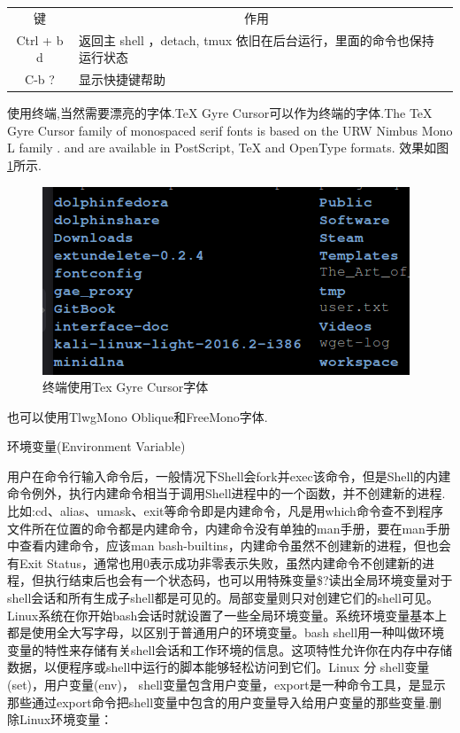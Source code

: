 \documentclass[12pt]{book}
\makeatletter
\numberwithin{dummy}{section}
\theoremstyle{ocrenumbox}
\theoremstyle{blacknumex}
\theoremstyle{blacknumbox}
\theoremstyle{ocrenum}
\renewcommand{\subsection}{\@startsection {subsection}{2}{\z@}
	{-3ex \@plus -0.1ex \@minus -.4ex}
	{0.5ex \@plus.2ex }
	{\normalfont\sffamily\bfseries}}
\makeatother
\begin{document}
\begin{tabular}{|c|p{8cm}|c|}
	\hline
	\multirow{1}{*}{键}
	& \multicolumn{1}{c|}{作用}  \\			
	\cline{1-2}
	Ctrl + b d  & 返回主 shell ，detach, tmux 依旧在后台运行，里面的命令也保持运行状态\\
	\hline
	C-b ? & 显示快捷键帮助\\
	\hline
\end{tabular}

使用终端,当然需要漂亮的字体.TeX Gyre Cursor可以作为终端的字体.The TeX Gyre Cursor family of monospaced serif fonts is based on the URW Nimbus Mono L family . and are available in PostScript, TeX and OpenType formats. 效果如图\ref{fig:fonttexgyrecursor}所示.

\begin{figure}[htbp]
	\centering
	\includegraphics[scale=0.5]{fonttexgyrecursor.png}
	\caption{终端使用Tex Gyre Cursor字体}
	\label{fig:fonttexgyrecursor}
\end{figure}

也可以使用TlwgMono Oblique和FreeMono字体.

\subsection{环境变量(Environment Variable)}

用户在命令行输入命令后，一般情况下Shell会fork并exec该命令，但是Shell的内建命令例外，执行内建命令相当于调用Shell进程中的一个函数，并不创建新的进程.
比如:cd、alias、umask、exit等命令即是内建命令，凡是用which命令查不到程序文件所在位置的命令都是内建命令，内建命令没有单独的man手册，要在man手册中查看内建命令，应该man bash-builtins，内建命令虽然不创建新的进程，但也会有Exit Status，通常也用0表示成功非零表示失败，虽然内建命令不创建新的进程，但执行结束后也会有一个状态码，也可以用特殊变量\$?读出全局环境变量对于shell会话和所有生成子shell都是可见的。局部变量则只对创建它们的shell可见。Linux系统在你开始bash会话时就设置了一些全局环境变量。系统环境变量基本上都是使用全大写字母，以区别于普通用户的环境变量。bash shell用一种叫做环境变量的特性来存储有关shell会话和工作环境的信息。这项特性允许你在内存中存储数据，以便程序或shell中运行的脚本能够轻松访问到它们。Linux 分 shell变量(set)，用户变量(env)， shell变量包含用户变量，export是一种命令工具，是显示那些通过export命令把shell变量中包含的用户变量导入给用户变量的那些变量.删除Linux环境变量：
\end{document}
